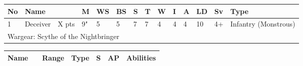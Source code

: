 \newpage
{}

\noindent
\begin{tabular}{||m{10pt} m{95pt} m{30pt} m{11pt} m{11pt} m{11pt} m{11pt} m{11pt} m{11pt} m{11pt} m{11pt} m{11pt} m{11pt} m{125pt}||}
	\hline
	No & Name & & M & WS & BS & S & T & W & I & A & LD & Sv & Type \\
	\hline
	1 & Deceiver & X pts & 9" & 5 & 5 & 7 & 7 & 4 & 4 & 4 & 10 & 4+ & Infantry (Monstrous)\\
	\hline
	\hline
	\multicolumn{14}{||Z{532 pt}||}{Wargear: Scythe of the Nightbringer}\\
	\hline
\end{tabular}

\noindent
\begin{tabular}{||m{140pt} m{0pt} m{31pt} m{55pt} m{12pt} m{12pt} m{210pt}||}
	\hline
	Name & & Range & Type & S & AP & Abilities \\
	\hline
	
	\hline
\end{tabular}


